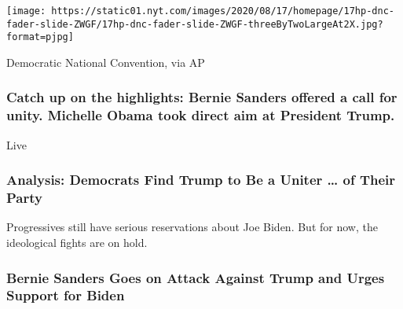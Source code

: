 \texttt{[image: https://static01.nyt.com/images/2020/08/17/homepage/17hp-dnc-fader-slide-ZWGF/17hp-dnc-fader-slide-ZWGF-threeByTwoLargeAt2X.jpg?format=pjpg]}

Democratic National Convention, via AP

\href{https://www.nytimes.com/live/2020/08/17/us/dnc-convention}{}

\hypertarget{catch-up-on-the-highlights-bernie-sanders-offered-a-call-for-unity-michelle-obama-took-direct-aim-at-president-trump}{%
\subsubsection{Catch up on the highlights: Bernie Sanders offered a call
for unity. Michelle Obama took direct aim at President
Trump.}\label{catch-up-on-the-highlights-bernie-sanders-offered-a-call-for-unity-michelle-obama-took-direct-aim-at-president-trump}}

Live

\href{https://www.nytimes.com/2020/08/17/us/politics/convention-democratic-night-1.html}{}

\hypertarget{analysis-democrats-find-trump-to-be-a-uniter--of-their-party}{%
\subsubsection{Analysis: Democrats Find Trump to Be a Uniter \ldots{} of
Their
Party}\label{analysis-democrats-find-trump-to-be-a-uniter--of-their-party}}

\href{https://www.nytimes.com/2020/08/17/us/politics/convention-democratic-night-1.html}{}

Progressives still have serious reservations about Joe Biden. But for
now, the ideological fights are on hold.

\href{https://www.nytimes.com/2020/08/17/us/politics/bernie-sanders-democratic-convention.html}{}

\hypertarget{bernie-sanders-goes-on-attack-against-trump-and-urges-support-for-biden}{%
\subsubsection{Bernie Sanders Goes on Attack Against Trump and Urges
Support for
Biden}\label{bernie-sanders-goes-on-attack-against-trump-and-urges-support-for-biden}}

\href{https://www.nytimes.com/2020/08/17/us/politics/bernie-sanders-democratic-convention.html}{}

